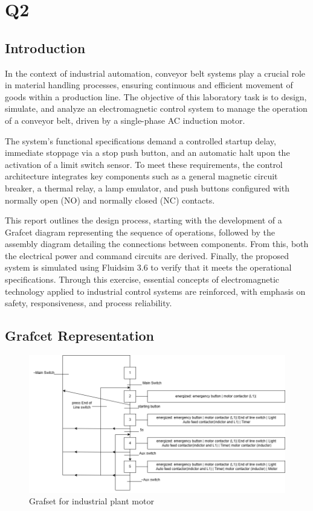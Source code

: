 \section{Q2} 

\subsection{Introduction} \label{sec:Introduction}

In the context of industrial automation, conveyor belt systems play a crucial role in material handling processes, 
ensuring continuous and efficient movement of goods within a production line. The objective of this laboratory task 
is to design, simulate, and analyze an electromagnetic control system to manage the operation of a conveyor belt, 
driven by a single-phase AC induction motor.

The system's functional specifications demand a controlled startup delay, immediate stoppage via a stop push 
button, and an automatic halt upon the activation of a limit switch sensor. To meet these requirements, the 
control architecture integrates key components such as a general magnetic circuit breaker, a thermal relay, 
a lamp emulator, and push buttons configured with normally open (NO) and normally closed (NC) contacts.

This report outlines the design process, starting with the development of a Grafcet diagram representing the 
sequence of operations, followed by the assembly diagram detailing the connections between components. From this, 
both the electrical power and command circuits are derived. Finally, the proposed system is simulated using 
Fluidsim 3.6 to verify that it meets the operational specifications. Through this exercise, essential concepts 
of electromagnetic technology applied to industrial control systems are reinforced, with emphasis on safety, 
responsiveness, and process reliability.

\subsection{Grafcet Representation} \label{sec:Grafcet_Representation}

\begin{figure}[H]
    \includegraphics[width=16cm]{Images/Q2/grafset.png}
    \centering
    \caption{Grafset for industrial plant motor}
    \label{fig:grafset_complex}
\end{figure}

